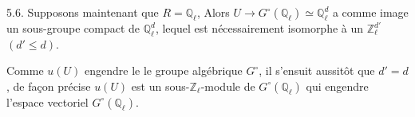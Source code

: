 5.6. Supposons maintenant que $R=\mathbb Q_\ell$,  
Alors $U\longrightarrow G^\circ(\mathbb Q_\ell)\simeq\mathbb Q_\ell^d$ a comme image un sous-groupe compact de $\mathbb Q_\ell^d$, lequel est nécessairement isomorphe à un $\mathbb Z_\ell^{d'}$ $(d'\leq d)$.

Comme  $u(U)$ engendre le le groupe algébrique $G^\circ$, il s'ensuit aussitôt que $d'=d$, de façon précise $u(U)$ est un sous-$\mathbb Z_\ell$-module de $G^\circ(\mathbb Q_\ell)$ qui engendre l'espace vectoriel $G^\circ(\mathbb Q_\ell)$.

